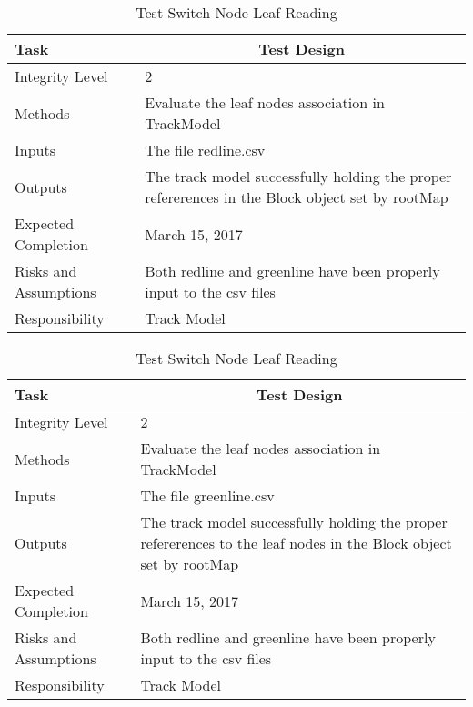 \documentclass[]{article}
\begin{document}
\begin{table}[H]
	\centering
	\caption{Test Switch Node Leaf Reading}
	\begin{tabular}{|l|l|}
		\hline
		Task & \multicolumn{1}{c|}{Test Design} \\ \hline
		Integrity Level & 2 \\ \hline
		Methods & Evaluate the leaf nodes association in TrackModel\\ \hline
		Inputs &  The file redline.csv \\ \hline
		Outputs & \parbox[t]{10cm}{ The track model successfully holding the proper refererences in the Block object set by rootMap}\\ \hline
		Expected Completion & March 15, 2017\\ \hline
		Risks and Assumptions & Both redline and greenline have been properly input to the csv files \\ \hline
		Responsibility & Track Model\\ \hline
	\end{tabular}
\end{table}

\begin{table}[H]
	\centering
	\caption{Test Switch Node Leaf Reading}
	\begin{tabular}{|l|l|}
		\hline
		Task & \multicolumn{1}{c|}{Test Design} \\ \hline
		Integrity Level & 2 \\ \hline
		Methods & Evaluate the leaf nodes association in TrackModel\\ \hline
		Inputs &  The file greenline.csv \\ \hline
		Outputs &  \parbox[t]{10cm}{The track model successfully holding the proper refererences to the leaf nodes in the Block object set by rootMap}\\ \hline
		Expected Completion & March 15, 2017\\ \hline
		Risks and Assumptions & Both redline and greenline have been properly input to the csv files \\ \hline
		Responsibility & Track Model\\ \hline
	\end{tabular}
\end{table}
\end{document}
